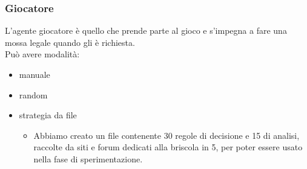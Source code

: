 \documentclass{beamer}
\newcommand*\lista{\item[$\diamondsuit$]}
\newcommand*\slista{\item[$\spadesuit$]}
\begin{document}

\begin{frame}
   \frametitle{Giocatore}
   L'agente giocatore è quello che prende parte al gioco e s'impegna a fare una mossa legale quando gli è richiesta.\\
   \vfill
   \pause   
   Può avere modalità:
   \begin{itemize}
      \lista manuale
      \lista random
      \lista strategia da file
      \pause
      \begin{itemize}
         \slista Abbiamo creato un file contenente 30 regole di decisione e 15 di analisi, raccolte da siti e forum dedicati alla briscola in 5, per poter essere usato nella fase di sperimentazione.
      \end{itemize}
   \end{itemize}
   
\end{frame}

\end{document}
